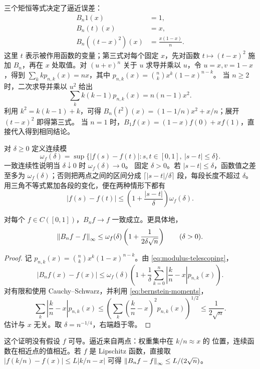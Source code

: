 三个矩恒等式决定了逼近误差：
\begin{align}
 B_n1(x)&=1,\\
 B_n(t)(x)&=x,\\
 B_n((t-x)^2)(x)&=\frac{x(1-x)}n.
 \label{eq:bernstein-moments}
\end{align}
这里 $t$ 表示被作用函数的变量；第三式对每个固定 $x$，先对函数
$t\mapsto(t-x)^2$ 施加 $B_n$，再在 $x$ 处取值。对 $(u+v)^n$
关于 $u$ 求导并乘以 $u$，令 $u=x,v=1-x$，得到
$\sum_k k p_{n,k}(x)=nx$，其中 $p_{n,k}(x)=\binom nkx^k(1-x)^{n-k}$。
当 $n\ge2$ 时，二次求导并乘以 $u^2$ 给出
\[
 \sum_k k(k-1)p_{n,k}(x)=n(n-1)x^2.
\]
利用 $k^2=k(k-1)+k$，可得
$B_n(t^2)(x)=(1-1/n)x^2+x/n$；展开 $(t-x)^2$ 即得第三式。
当 $n=1$ 时，$B_1f(x)=(1-x)f(0)+xf(1)$，直接代入得到相同结论。

对 $\delta\ge0$ 定义连续模
\[
 \omega_f(\delta)=\sup\{|f(s)-f(t)|:s,t\in[0,1],\ |s-t|\le\delta\}.
\]
一致连续性说明当 $\delta\downarrow0$ 时 $\omega_f(\delta)\to0$。
固定 $\delta>0$。若 $|s-t|\le\delta$，函数值之差至多为
$\omega_f(\delta)$；否则把两点之间的区间分成
$\lceil|s-t|/\delta\rceil$ 段，每段长度不超过 $\delta$。
用三角不等式累加各段的变化，便在两种情形下都有
\begin{equation}
 |f(s)-f(t)|\le
 \left(1+\frac{|s-t|}{\delta}\right)\omega_f(\delta).
 \label{eq:modulus-telescoping}
\end{equation}

\begin{theorem}[Bernstein 逼近]
\label{thm:bernstein-uniform-approximation}
对每个 $f\in C([0,1])$，$B_nf\to f$ 一致成立。更具体地，
\[
 \left\lVert B_nf-f\right\rVert_\infty
 \le\omega_f(\delta)
 \left(1+\frac{1}{2\delta\sqrt n}\right)
 \qquad(\delta>0).
\]
\end{theorem}

\begin{proof}
记 $p_{n,k}(x)=\binom nkx^k(1-x)^{n-k}$。由
\eqref{eq:modulus-telescoping}，
\[
 |B_nf(x)-f(x)|
 \le\omega_f(\delta)
 \left(1+\frac1\delta\sum_{k=0}^n
 \left|\frac kn-x\right|p_{n,k}(x)\right).
\]
对有限和使用 Cauchy--Schwarz，并利用 \eqref{eq:bernstein-moments}，
\[
 \sum_k\left|\frac kn-x\right|p_{n,k}(x)
 \le\left(\sum_k\left(\frac kn-x\right)^2p_{n,k}(x)\right)^{1/2}
 \le\frac1{2\sqrt n}.
\]
估计与 $x$ 无关。取 $\delta=n^{-1/4}$，右端趋于零。
\end{proof}

这个证明没有假设 $f$ 可导。逼近来自两点：权重集中在 $k/n\approx x$ 的
位置，连续函数在相近点的值相近。若 $f$ 是 Lipschitz 函数，直接取
$|f(k/n)-f(x)|\le L|k/n-x|$ 可得
$\left\lVert B_nf-f\right\rVert_\infty\le L/(2\sqrt n)$。

